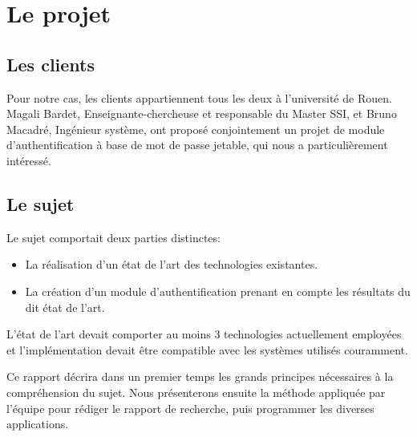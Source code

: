  
\section{Le projet}


\subsection{Les clients}
Pour notre cas, les clients appartiennent tous les deux à l'université de Rouen. Magali Bardet, Enseignante-chercheuse et responsable du Master SSI, et Bruno Macadré, Ingénieur système, ont proposé conjointement un projet de module d'authentification à base de mot de passe jetable, qui nous a particulièrement intéressé.
\newpage

\subsection{Le sujet}

Le sujet comportait deux parties distinctes: 
\begin{itemize}
\item La réalisation d'un état de l'art des technologies existantes.
\item La création d'un module d'authentification prenant en compte les résultats du dit état de l'art.
\end{itemize}

L'état de l'art devait comporter au moins 3 technologies actuellement employées et l'implémentation devait être compatible avec les systèmes utilisés couramment.
\newline

Ce rapport décrira dans un premier temps les grands principes nécessaires à la compréhension du sujet. Nous présenterons ensuite la méthode appliquée par l'équipe pour rédiger le rapport de recherche, puis programmer les diverses applications. 